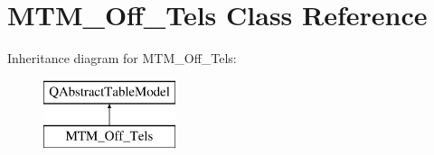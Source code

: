 \hypertarget{class_m_t_m___off___tels}{}\section{M\+T\+M\+\_\+\+Off\+\_\+\+Tels Class Reference}
\label{class_m_t_m___off___tels}
Inheritance diagram for M\+T\+M\+\_\+\+Off\+\_\+\+Tels\+:\begin{figure}[H]
\begin{center}
\leavevmode
\includegraphics[height=2.000000cm]{class_m_t_m___off___tels}
\end{center}
\end{figure}

